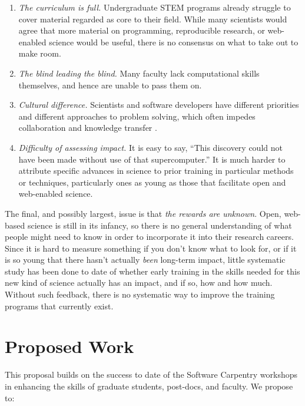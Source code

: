 \documentclass{proposalnsf}
\newlength{\up}
\begin{document}
\begin{enumerate}

\item
  \emph{The curriculum is full.}  Undergraduate STEM programs already
  struggle to cover material regarded as core to their field.  While
  many scientists would agree that more material on programming,
  reproducible research, or web-enabled science would be useful, there
  is no consensus on what to take out to make room.

\item
  \emph{The blind leading the blind.}  Many faculty lack computational
  skills themselves, and hence are unable to pass them on.

\item
  \emph{Cultural difference.}  Scientists and software developers have
  different priorities and different approaches to problem solving,
  which often impedes collaboration and knowledge transfer
  \cite{segal2005a}.

\item
  \emph{Difficulty of assessing impact.} It is easy to say, ``This
  discovery could not have been made without use of that
  supercomputer.''  It is much harder to attribute specific advances
  in science to prior training in particular methods or techniques,
  particularly ones as young as those that facilitate open and
  web-enabled science.

\end{enumerate}

The final, and possibly largest, issue is that \emph{the rewards are
  unknown}.  Open, web-based science is still in its infancy, so there
is no general understanding of what people might need to know in order
to incorporate it into their research careers.  Since it is hard to
measure something if you don't know what to look for, or if it is so
young that there hasn't actually \emph{been} long-term impact, little
systematic study has been done to date of whether early training in
the skills needed for this new kind of science actually has an impact,
and if so, how and how much.  Without such feedback, there is no
systematic way to improve the training programs that currently exist.

\section{Proposed Work}

This proposal builds on the success to date of the Software Carpentry
workshops in enhancing the skills of graduate students, post-docs, and
faculty.  We propose to:
\end{document}
